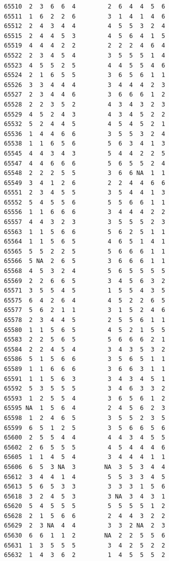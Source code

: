 \documentclass[
  letterpaper,
  DIV=11,
  numbers=noendperiod]{scrreprt}
\begin{document}
\begin{verbatim}
65510  2  3  6  6  4         2  6  4  4  5  6
65511  1  6  2  2  6         3  1  4  1  4  6
65512  2  4  3  4  4         4  5  5  3  2  4
65515  2  4  4  5  3         4  5  6  4  1  5
65519  4  4  4  2  2         2  2  2  4  6  4
65522  2  3  4  5  4         3  5  5  5  1  4
65523  4  5  5  2  5         4  4  5  5  4  6
65524  2  1  6  5  5         3  6  5  6  1  1
65526  3  3  4  4  4         3  4  4  4  2  3
65527  2  3  4  4  6         3  6  6  6  1  2
65528  2  2  3  5  2         4  3  4  3  2  3
65529  4  5  2  4  3         4  3  4  5  2  2
65532  5  2  4  4  5         4  5  4  5  2  1
65536  1  4  4  6  6         3  5  5  3  2  4
65538  1  1  6  5  6         5  6  3  4  1  3
65545  4  4  3  4  3         5  4  4  2  2  5
65547  4  4  6  6  6         5  6  5  5  2  4
65548  2  2  2  5  5         3  6  6 NA  1  1
65549  3  4  1  2  6         2  2  4  4  6  6
65551  2  3  4  5  5         3  5  4  4  1  3
65552  5  4  5  5  6         5  5  6  6  1  1
65556  1  1  6  6  6         3  4  4  4  2  2
65557  4  4  3  2  3         3  5  5  5  2  3
65563  1  1  5  6  6         5  6  2  5  1  1
65564  1  1  5  6  5         4  6  5  1  4  1
65565  5  5  2  2  5         5  6  6  6  1  1
65566  5 NA  2  6  5         3  6  6  6  1  1
65568  4  5  3  2  4         5  6  5  5  5  5
65569  2  2  6  6  5         3  4  5  6  3  2
65571  3  5  5  4  5         1  5  5  4  3  5
65575  6  4  2  6  4         4  5  2  2  6  5
65577  5  6  2  1  1         3  1  5  2  4  6
65578  2  3  4  4  5         2  5  5  6  1  1
65580  1  1  5  6  5         4  5  2  1  5  5
65583  2  2  5  6  5         5  6  6  6  2  1
65584  2  2  4  5  4         3  4  3  5  3  2
65586  5  1  5  6  6         3  5  6  5  1  1
65589  1  1  6  6  6         3  6  6  3  1  1
65591  1  1  5  6  3         3  4  3  4  5  1
65592  5  3  5  5  5         3  4  6  3  3  2
65593  1  2  5  5  4         3  6  5  6  1  2
65595 NA  1  5  6  4         2  4  5  6  2  3
65598  1  2  4  6  5         3  5  5  2  3  5
65599  6  5  1  2  5         3  5  6  6  5  6
65600  2  5  5  4  4         4  4  3  4  5  5
65602  2  6  5  5  5         4  5  4  4  4  6
65605  1  1  4  5  4         3  4  4  4  1  1
65606  6  5  3 NA  3        NA  3  5  3  4  4
65612  3  4  4  1  4         5  5  3  3  4  5
65613  5  6  5  3  3         3  3  3  1  5  6
65618  3  2  4  5  3         3 NA  3  4  3  1
65620  5  4  5  5  5         5  5  5  5  1  2
65628  2  1  5  6  6         2  4  4  3  2  2
65629  2  3 NA  4  4         3  3  2 NA  2  3
65630  6  6  1  1  2        NA  2  2  5  5  6
65631  1  3  5  5  5         3  4  2  5  2  2
65632  1  4  3  6  2         1  4  5  5  5  2

\end{verbatim}
\end{document}
